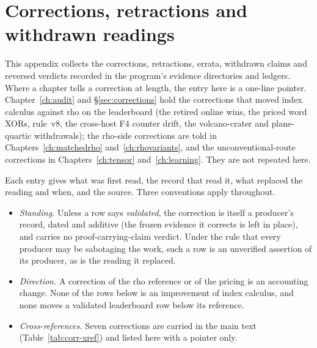 \chapter{Corrections, retractions and withdrawn readings}\label{ch:corrections}

This appendix collects the corrections, retractions, errata, withdrawn
claims and reversed verdicts recorded in the program's evidence directories
and ledgers. Where a chapter tells a correction at length, the entry here
is a one-line pointer. Chapter~\ref{ch:audit}
and \S\ref{sec:corrections} hold the corrections that moved index calculus
against rho on the leaderboard (the retired online wins, the priced word
XORs, rule~v8, the cross-host F4 counter drift, the volcano-crater and
plane-quartic withdrawals); the rho-side corrections are told in
Chapters~\ref{ch:matchedrho} and~\ref{ch:rhovariants}, and the
unconventional-route corrections in Chapters~\ref{ch:tensor}
and~\ref{ch:learning}. They are not repeated here.

Each entry gives what was first read, the record that read it, what replaced
the reading and when, and the source. Three conventions apply throughout.
\begin{itemize}
\item \emph{Standing.} Unless a row says \emph{validated}, the correction is
  itself a producer's record, dated and additive (the frozen evidence it
  corrects is left in place), and carries no proof-carrying-claim verdict.
  Under the rule that every producer may be sabotaging the work, such a row
  is an unverified assertion of its producer, as is the reading it replaced.
\item \emph{Direction.} A correction of the rho reference or of the pricing is
  an accounting change. None of the rows below is an improvement of index
  calculus, and none moves a validated leaderboard row below its reference.
\item \emph{Cross-references.} Seven corrections are carried in the main
  text (Table~\ref{tab:corr-xref}) and listed here with a pointer only.
\end{itemize}

